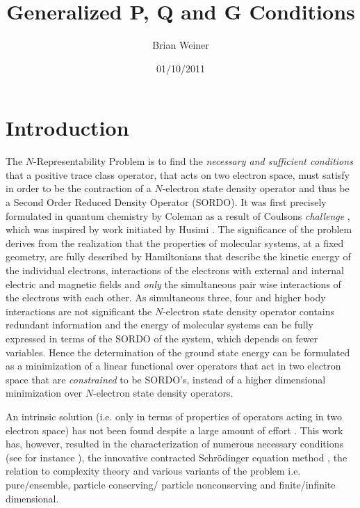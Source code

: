 \documentclass[aps,preprint]{revtex4}%
\begin{document}
\preprint{ }
\title[P,Q, and G Conditions]{Generalized P, Q and G Conditions}
\author{Brian Weiner}
\keywords{}
\pacs{}

\begin{abstract}


\end{abstract}
\date{01/10/2011}
\maketitle
\tableofcontents


\section{Introduction \label{Intro}}

The $N$-Representability Problem is to find the \emph{necessary and sufficient
conditions} that a positive trace class operator, that acts on two electron
space, must satisfy in order to be the contraction of a $N$-electron state
density operator and thus be a Second Order Reduced Density Operator (SORDO).
It was first precisely formulated in quantum chemistry \cite{Coleman63} by
Coleman as a result of Coulsons \emph{challenge }\cite{Coleman2000}, which was
inspired by work initiated by Husimi \cite{Husimi}. The significance of the
problem derives from the realization that the properties of molecular systems,
at a fixed geometry, are fully described by Hamiltonians that describe the
kinetic energy of the individual electrons, interactions of the electrons with
external and internal electric and magnetic fields and \emph{only }the
simultaneous pair wise interactions of the electrons with each other. As
simultaneous three, four and higher body interactions are not significant the
$N$-electron state density operator contains redundant information and the
energy of molecular systems can be fully expressed in terms of the SORDO of
the system, which depends on fewer variables. Hence the determination of the
ground state energy can be formulated as a minimization of a linear functional
over operators that act in two electron space that are \emph{constrained} to
be SORDO's, instead of a higher dimensional minimization over $N$-electron
state density operators.

An intrinsic solution (i.e. only in terms of properties of operators acting in
two electron space) has not been found despite a large amount of effort
\cite{Mazziotti}. This work has, however, resulted in the characterization of
numerous necessary conditions (see for instance \cite{NecCon}), the innovative
contracted Schr\"{o}dinger equation method \cite{ContSch}, the relation to
complexity theory \cite{NPhard} and various variants of the problem i.e.
pure/ensemble, particle conserving/ particle nonconserving and finite/infinite dimensional.
\end{document}
